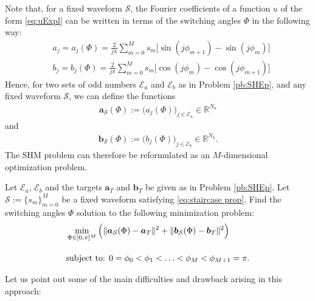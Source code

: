 \documentclass[twocolumn]{autart}    %
\begin{document}
Note that, for a fixed waveform $\mathcal{S}$, the Fourier coefficients of a function $u$ of the form \eqref{eq:uExpl} can be written in terms of the switching angles $\Phi$ in the following way:
\begin{align*}
	& a_j = a_j(\Phi) =  \frac{2}{j\pi} \sum_{m=0}^{M} s_m \Big[\sin(j\phi_{m+1}) -\sin(j\phi_{m})\Big]
	\\[5pt]
	& b_j = b_j(\Phi) = \frac{2}{j\pi} \sum_{m=0}^{M} s_m \Big[\cos(j\phi_{m}) -\cos(j\phi_{m+1})\Big]
\end{align*}
Hence, for two sets of odd numbers $\mathcal{E}_a$ and $\mathcal{E}_b$ as in Problem \ref{pb:SHEp}, and any fixed waveform $\mathcal{S}$, we can define the functions
\begin{align*}
	\bm{a}_\mathcal{S} (\Phi) := \big(a_j (\Phi)\big)_{j\in \mathcal{E}_a} \in \mathbb{R}^{N_a}
\end{align*}
and
\begin{align*}
	\bm{b}_\mathcal{S} (\Phi) := \big(b_j (\Phi)\big)_{j\in \mathcal{E}_b} \in \mathbb{R}^{N_b}.
\end{align*}
The SHM problem can therefore be reformulated as an $M$-dimensional optimization problem.

\bigskip

\begin{problem}\label{pb:SHE opt}
Let $\mathcal{E}_a$, $\mathcal{E}_b$ and the targets $\bm{a}_T$ and $\bm{b}_T$ be given as in Problem \ref{pb:SHEp}.  Let $\mathcal S := \{ s_m\}_{m=0}^M$ be a fixed waveform satisfying \eqref{eq:staircase prop}.  Find the switching angles $\Phi$ solution to the following minimization problem:
\begin{align}
	&\min_{\Phi \in [0,\pi]^{M}} \Big( \|\bm{a}_\mathcal{S} (\Phi) - \bm{a}_T\|^2 + \| \bm{b}_\mathcal{S} (\Phi) - \bm{b}_T\|^2\Big)\notag 
	\\[10pt]
	&\mbox{subject to: } 0 = \phi_0 <\phi_1 < \ldots < \phi_{M} < \phi_{M+1} = \pi. \notag 
\end{align}
\end{problem}

Let us point out some of the main difficulties and drawback arising in this approach: 
\end{document}
